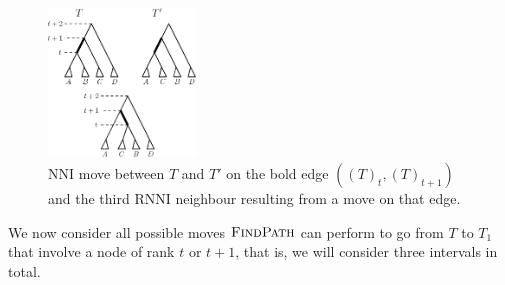 \documentclass[11pt]{amsart}
\newcommand{\rnni}{\mathrm{RNNI}}
\newcommand{\findpath}{\textsc{FindPath}}
\newcommand{\nni}{\mathrm{NNI}}
\begin{document}
\begin{figure}[ht]
\centering
\includegraphics[width=0.35\textwidth]{thm_fp_nni1}
\caption{$\nni$ move between $T$ and $T'$ on the bold edge $((T)_t,(T)_{t+1})$ and the third $\rnni$ neighbour resulting from a move on that edge.}
\label{fig:thm_fp_nni1}
\end{figure}

We now consider all possible moves $\findpath$ can perform to go from $T$ to $T_1$ that involve a node of rank $t$ or $t+1$, that is, we will consider three intervals in total.
\end{document}
